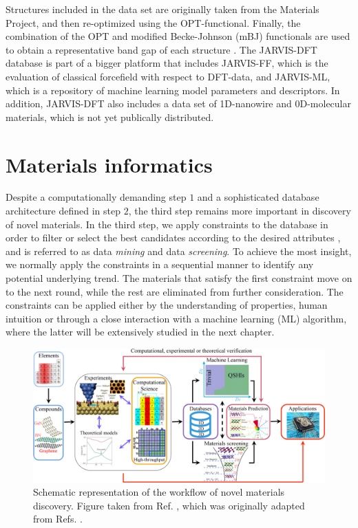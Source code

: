 Structures included in the data set are originally taken from the Materials Project, and then re-optimized using the OPT-functional. Finally, the combination of the OPT and modified Becke-Johnson (mBJ) functionals are used to obtain a representative band gap of each structure \cite{Choudhary2018a}. %
The JARVIS-DFT database is part of a bigger platform that includes JARVIS-FF, which is the evaluation of classical forcefield with respect to DFT-data, and JARVIS-ML, which is a repository of machine learning model parameters and descriptors.
In addition, JARVIS-DFT also includes a data set of 1D-nanowire and 0D-molecular materials, which is not yet publically distributed.

\section{Materials informatics}

Despite a computationally demanding step $1$ and a sophisticated database architecture defined in step $2$, the third step remains more important in discovery of novel materials. In the third step, we apply constraints to the database in order to filter or select the best candidates according to the desired attributes \cite{Schleder2019}, and is referred to as data \textit{mining} and data \textit{screening}. To achieve the most insight, we normally apply the constraints in a sequential manner to identify any potential underlying trend. The materials that satisfy the first constraint move on to the next round, while the rest are eliminated from further consideration. The constraints can be applied either by the understanding of properties, human intuition or through a close interaction with a machine learning (ML) algorithm, where the latter will be extensively studied in the next chapter.

\begin{figure}[ht!]
  \centering
  \includegraphics{theory/figures/ht-workflow.jpg}
  \caption{Schematic representation of the workflow of novel materials discovery.  Figure taken from Ref. \cite{Schleder2019}, which was originally adapted from Refs. \cite{Mounet2018, Acosta2018, Polini2013}.}
  \label{fig:ht-workflow}
\end{figure}

